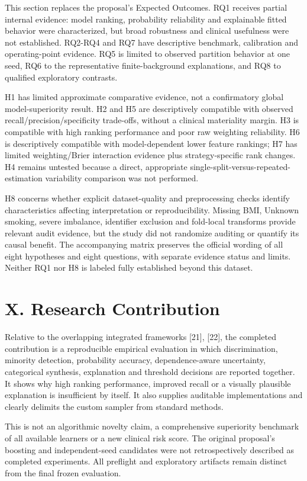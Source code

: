 \documentclass[10pt,twocolumn,letterpaper]{article}
\begin{document}
This section replaces the proposal's Expected Outcomes. RQ1 receives partial internal evidence: model ranking, probability reliability and explainable fitted behavior were characterized, but broad robustness and clinical usefulness were not established. RQ2-RQ4 and RQ7 have descriptive benchmark, calibration and operating-point evidence. RQ5 is limited to observed partition behavior at one seed, RQ6 to the representative finite-background explanations, and RQ8 to qualified exploratory contrasts.


H1 has limited approximate comparative evidence, not a confirmatory global model-superiority result. H2 and H5 are descriptively compatible with observed recall/precision/specificity trade-offs, without a clinical materiality margin. H3 is compatible with high ranking performance and poor raw weighting reliability. H6 is descriptively compatible with model-dependent lower feature rankings; H7 has limited weighting/Brier interaction evidence plus strategy-specific rank changes. H4 remains untested because a direct, appropriate single-split-versus-repeated-estimation variability comparison was not performed.


H8 concerns whether explicit dataset-quality and preprocessing checks identify characteristics affecting interpretation or reproducibility. Missing BMI, Unknown smoking, severe imbalance, identifier exclusion and fold-local transforms provide relevant audit evidence, but the study did not randomize auditing or quantify its causal benefit. The accompanying matrix preserves the official wording of all eight hypotheses and eight questions, with separate evidence status and limits. Neither RQ1 nor H8 is labeled fully established beyond this dataset.


\section*{X. Research Contribution}
Relative to the overlapping integrated frameworks [21], [22], the completed contribution is a reproducible empirical evaluation in which discrimination, minority detection, probability accuracy, dependence-aware uncertainty, categorical synthesis, explanation and threshold decisions are reported together. It shows why high ranking performance, improved recall or a visually plausible explanation is insufficient by itself. It also supplies auditable implementations and clearly delimits the custom sampler from standard methods.


This is not an algorithmic novelty claim, a comprehensive superiority benchmark of all available learners or a new clinical risk score. The original proposal's boosting and independent-seed candidates were not retrospectively described as completed experiments. All preflight and exploratory artifacts remain distinct from the final frozen evaluation.
\end{document}
